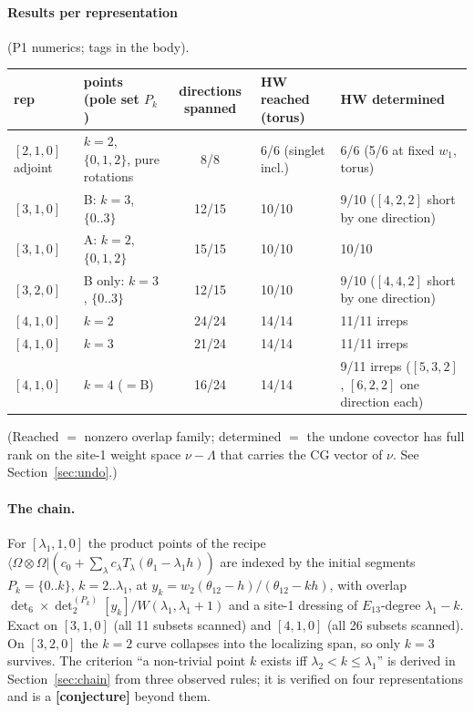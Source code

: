 \documentclass[11pt]{article}
\newcommand{\bra}[1]{\langle #1|}
\newcommand{\Om}{\Omega}
\newcommand{\thh}{\theta_{12}}
\newcommand{\cj}{\textbf{[conjecture]}}
\begin{document}
\paragraph{Results per representation} (P1 numerics; tags in the body).
\begin{center}\small
\begin{tabular}{@{}p{2.4cm}p{3.6cm}cp{2.6cm}p{4.2cm}@{}}\toprule
rep & points (pole set $P_k$) & directions spanned & HW reached (torus) & HW determined\\\midrule
$[2,1,0]$ adjoint & $k=2$, $\{0,1,2\}$, pure rotations & 8/8 & 6/6 (singlet incl.) & 6/6 (5/6 at fixed $w_1$, torus)\\
$[3,1,0]$ & B: $k=3$, $\{0..3\}$ & 12/15 & 10/10 & 9/10 ($[4,2,2]$ short by one direction)\\
$[3,1,0]$ & A: $k=2$, $\{0,1,2\}$ & 15/15 & 10/10 & 10/10\\
$[3,2,0]$ & B only: $k=3$, $\{0..3\}$ & 12/15 & 10/10 & 9/10 ($[4,4,2]$ short by one direction)\\
$[4,1,0]$ & $k=2$ & 24/24 & 14/14 & 11/11 irreps\\
$[4,1,0]$ & $k=3$ & 21/24 & 14/14 & 11/11 irreps\\
$[4,1,0]$ & $k=4$ ($=$B) & 16/24 & 14/14 & 9/11 irreps ($[5,3,2]$, $[6,2,2]$ one direction each)\\\bottomrule
\end{tabular}
\end{center}
(Reached $=$ nonzero overlap family; determined $=$ the undone covector has full rank on the site-1 weight space $\nu-\Lambda$ that carries the CG vector of $\nu$. See Section~\ref{sec:undo}.)

\paragraph{The chain.} For $[\lambda_1,1,0]$ the product points of the recipe $\bra{\Om\otimes\Om}(c_0+\sum_\lambda c_\lambda T_\lambda(\theta_1-\lambda_1h))$ are indexed by the initial segments $P_k=\{0..k\}$, $k=2..\lambda_1$, at $y_k=w_2(\thh-h)/(\thh-kh)$, with overlap $\det_6\times\det_2^{(P_k)}[y_k]/W(\lambda_1,\lambda_1+1)$ and a site-1 dressing of $E_{13}$-degree $\lambda_1-k$. Exact on $[3,1,0]$ (all 11 subsets scanned) and $[4,1,0]$ (all 26 subsets scanned). On $[3,2,0]$ the $k=2$ curve collapses into the localizing span, so only $k=3$ survives. The criterion ``a non-trivial point $k$ exists iff $\lambda_2<k\le\lambda_1$'' is derived in Section~\ref{sec:chain} from three observed rules; it is verified on four representations and is a \cj{} beyond them.
\end{document}
